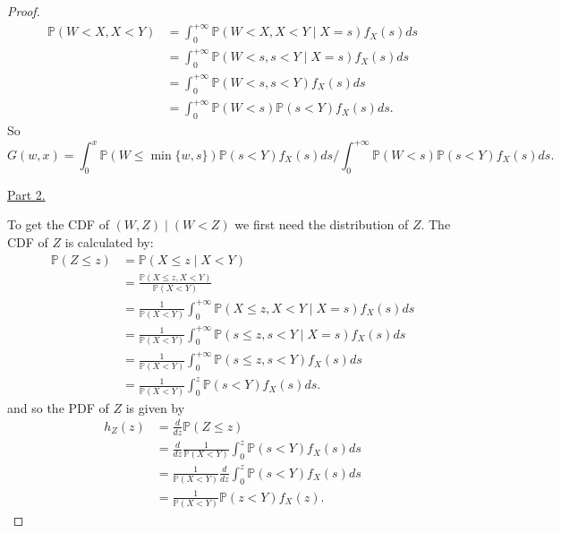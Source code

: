 \documentclass[stat_333_lecture_notes.tex]{subfiles}
\begin{document}
\begin{proof}
    \begin{align*}
        \mathbb{P}(W<X, X<Y) & = \int_{0}^{+\infty}\mathbb{P}(W<X, X<Y \mid X=s)f_{X}(s)ds   \\
                             & = \int_{0}^{+\infty}\mathbb{P}(W<s, s<Y \mid X=s)f_{X}(s)ds   \\
                             & = \int_{0}^{+\infty}\mathbb{P}(W<s, s<Y)f_{X}(s)ds            \\
                             & = \int_{0}^{+\infty}\mathbb{P}(W<s)\mathbb{P}(s<Y)f_{X}(s)ds.
    \end{align*}
    So
    \[G(w,x) = \int_{0}^{x}\mathbb{P}(W \leq \min\{w,s\})\mathbb{P}(s<Y)f_{X}(s)ds \bigg/ \int_{0}^{+\infty}\mathbb{P}(W<s)\mathbb{P}(s<Y)f_{X}(s)ds.\]

    \noindent \underline{Part 2.}

    To get the CDF of \((W,Z) \mid (W<Z)\) we first need the distribution of \(Z\).
    The CDF of \(Z\) is calculated by:
    \begin{align*}
        \mathbb{P}(Z \leq z) & = \mathbb{P}(X \leq z \mid X<Y)                                                           \\
                             & = \frac{\mathbb{P}(X \leq z, X<Y)}{\mathbb{P}(X<Y)}                                       \\
                             & = \frac{1}{\mathbb{P}(X<Y)}\int_{0}^{+\infty}\mathbb{P}(X \leq z, X<Y \mid X=s)f_{X}(s)ds \\
                             & = \frac{1}{\mathbb{P}(X<Y)}\int_{0}^{+\infty}\mathbb{P}(s \leq z, s<Y \mid X=s)f_{X}(s)ds \\
                             & = \frac{1}{\mathbb{P}(X<Y)}\int_{0}^{+\infty}\mathbb{P}(s \leq z, s<Y)f_{X}(s)ds          \\
                             & = \frac{1}{\mathbb{P}(X<Y)}\int_{0}^{z}\mathbb{P}(s<Y)f_{X}(s)ds.
    \end{align*}
    and so the PDF of \(Z\) is given by
    \begin{align*}
        h_{Z}(z) & = \frac{d}{dz}\mathbb{P}(Z \leq z)                                           \\
                 & = \frac{d}{dz}\frac{1}{\mathbb{P}(X<Y)}\int_{0}^{z}\mathbb{P}(s<Y)f_{X}(s)ds \\
                 & = \frac{1}{\mathbb{P}(X<Y)}\frac{d}{dz}\int_{0}^{z}\mathbb{P}(s<Y)f_{X}(s)ds \\
                 & = \frac{1}{\mathbb{P}(X<Y)}\mathbb{P}(z<Y)f_{X}(z).
    \end{align*}


\end{proof}
\end{document}
